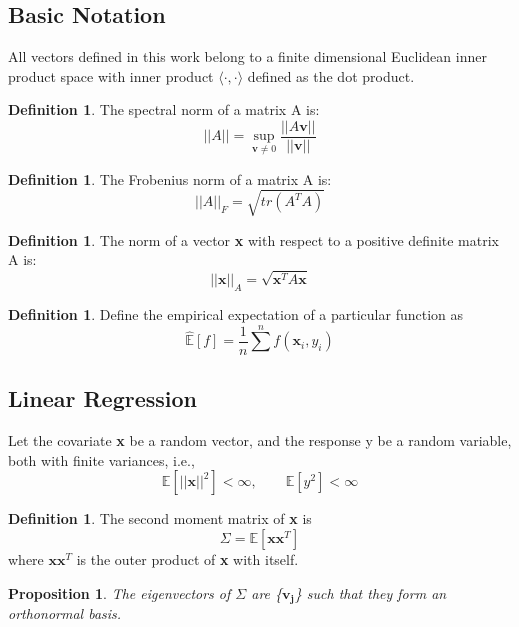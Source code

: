\documentclass[nohyperref]{article}
\theoremstyle{plain}
\newtheorem{proposition}[theorem]{Proposition}
\theoremstyle{definition}
\newtheorem{definition}[theorem]{Definition}
\theoremstyle{remark}
\begin{document}
\subsection{Basic Notation}
All vectors defined in this work belong to a finite dimensional Euclidean inner product space with inner product $\langle \cdot, \cdot \rangle$ defined as the dot product.


\begin{definition}
\label{def:specnorm}
The spectral norm of a matrix A is: $$||A|| = \sup_{\textbf{v} \neq 0} \frac{||A\textbf{v}||}{||\textbf{v}||}$$
\end{definition}

\begin{definition}
\label{def:frobnorm}
The Frobenius norm of a matrix A is: $$||A||_F = \sqrt{tr(A^TA)}$$
\end{definition}

\begin{definition}
\label{def:norm}
The norm of a vector \textbf{x} with respect to a positive definite matrix A is: $$||\textbf{x}||_A = \sqrt{\textbf{x}^T A\textbf{x}}$$
\end{definition}

\begin{definition}
\label{def:empexp}
Define the empirical expectation of a particular function as $$\hat{\mathbb{E}}[f] = \frac{1}{n} \sum^n f(\textbf{x}_i, y_i)$$
\end{definition}



\subsection{Linear Regression}
Let the covariate \textbf{x} be a random vector, and the response y be a random variable, both with finite variances, i.e.,
$$\mathbb{E}[||\textbf{x}||^2] < \infty, \qquad \mathbb{E}[y^2] < \infty$$

\pagebreak

\begin{definition}
\label{def:cov}
The second moment matrix of \textbf{x} is $$\Sigma = \mathbb{E}[\textbf{xx}^T]$$ where $\textbf{xx}^T$ is the outer product of \textbf{x} with itself. 
\end{definition}

\begin{proposition}
\label{prop:eigvec}
The eigenvectors of $\Sigma$ are \{$\mathbf{v_j}$\} such that they form an orthonormal basis.
\end{proposition}
\end{document}
